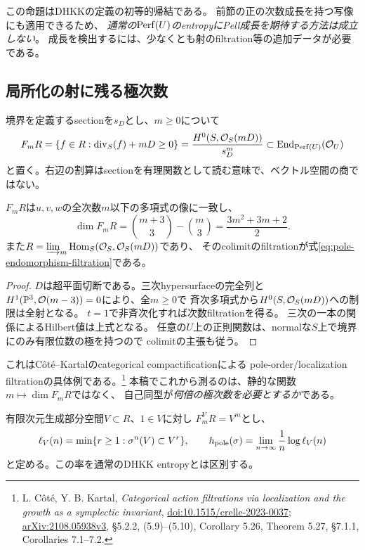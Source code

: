 この命題はDHKKの定義の初等的帰結である。
前節の正の次数成長を持つ写像にも適用できるため、
\emph{通常の$\operatorname{Perf}(U)$のentropyにPell成長を期待する方法は成立しない}。
成長を検出するには、少なくとも射のfiltration等の追加データが必要である。

\subsection{局所化の射に残る極次数}
境界を定義するsectionを$s_D$とし、$m\ge0$について
\begin{equation}\label{eq:pole-endomorphism-filtration}
 F_mR=\{f\in R:\operatorname{div}_S(f)+mD\ge0\}
 =\frac{H^0(S,\mathcal O_S(mD))}{s_D^m}
 \subset\operatorname{End}_{\operatorname{Perf}(U)}(\mathcal O_U)
\end{equation}
と置く。右辺の割算はsectionを有理関数として読む意味で、ベクトル空間の商ではない。

\begin{lemma}[次数filtrationと局所化表示]
\label{lem:pole-degree-localization}
$F_mR$は$u,v,w$の全次数$m$以下の多項式の像に一致し、
\[
 \dim F_mR=\binom{m+3}{3}-\binom m3
 =\frac{3m^2+3m+2}{2}.
\]
また$R=\varinjlim_m\operatorname{Hom}_S(\mathcal O_S,\mathcal O_S(mD))$であり、
そのcolimitのfiltrationが式\eqref{eq:pole-endomorphism-filtration}である。
\end{lemma}
\begin{proof}
$D$は超平面切断である。三次hypersurfaceの完全列と
$H^1(\mathbb P^3,\mathcal O(m-3))=0$により、全$m\ge0$で
斉次多項式から$H^0(S,\mathcal O_S(mD))$への制限は全射となる。
$t=1$で非斉次化すれば次数filtrationを得る。
三次の一本の関係によるHilbert値は上式となる。
任意の$U$上の正則関数は、normalな$S$上で境界にのみ有限位数の極を持つので
colimitの主張も従う。
\end{proof}

これはC\^ot\'{e}--Kartalのcategorical compactificationによる
pole-order/localization filtrationの具体例である。\footnote{
L. C\^ot\'{e}, Y. B. Kartal,
\emph{Categorical action filtrations via localization and the growth as a symplectic invariant},
\href{https://doi.org/10.1515/crelle-2023-0037}{doi:10.1515/crelle-2023-0037};
\href{https://arxiv.org/abs/2108.05938v3}{arXiv:2108.05938v3},
\S5.2.2, (5.9)--(5.10), Corollary 5.26, Theorem 5.27,
\S7.1.1, Corollaries 7.1--7.2.}
本稿でこれから測るのは、静的な関数$m\mapsto\dim F_mR$ではなく、
自己同型が\emph{何倍の極次数を必要とするか}である。

\begin{definition}[射filtrationの歪み率]
\label{def:morphism-filtration-distortion}
有限次元生成部分空間$V\subset R$、$1\in V$に対し
$F_m^VR=V^m$とし、
\[
 \ell_V(n)=\min\{r\ge1:\sigma^n(V)\subset V^r\},\qquad
 h_{\rm pole}(\sigma)=\lim_{n\to\infty}\frac1n\log\ell_V(n)
\]
と定める。この率を通常のDHKK entropyとは区別する。
\end{definition}

